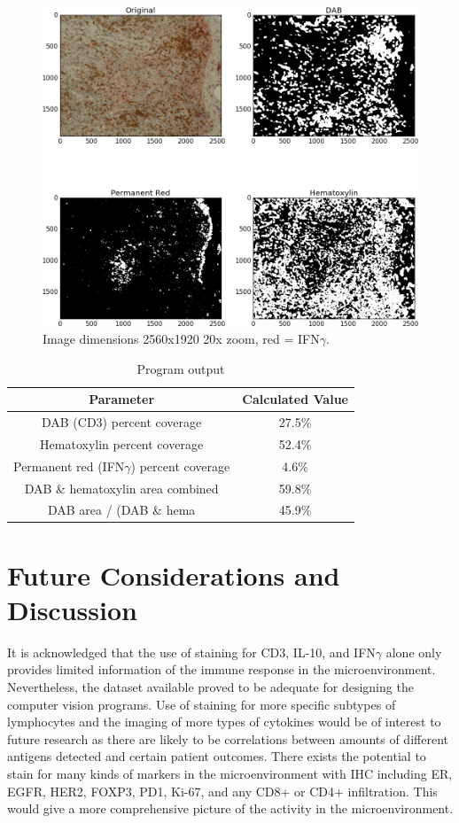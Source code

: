 \documentclass[12pt]{article}
\begin{document}
\begin{figure}[H]
  \includegraphics[width=\linewidth]{12_IFNg_20x.png}
  \caption{Image dimensions 2560x1920
20x zoom, red = IFN$\gamma$.}
  \label{fig:12 IFNg}
\end{figure}


\begin{table}[H]
\centering
\caption{Program output}
\label{program output}
\begin{tabular}{|c|c|}
\hline
\textbf{Parameter} & \textbf{Calculated Value} \\ \hline
DAB (CD3) percent coverage & 27.5\% \\ \hline
Hematoxylin percent coverage & 52.4\% \\ \hline
Permanent red (IFN$\gamma$) percent coverage & 4.6\% \\ \hline
DAB \& hematoxylin area combined & 59.8\% \\ \hline
DAB area / (DAB \& hema & 45.9\% \\ \hline
\end{tabular}
\end{table}


\section*{Future Considerations and Discussion}

It is acknowledged that the use of staining for CD3, IL-10, and IFN$\gamma$ alone only provides
limited information of the immune response in the microenvironment. Nevertheless, the dataset
available proved to be adequate for designing the computer vision programs. Use of staining for more
specific subtypes of lymphocytes and the imaging of more types of cytokines would be of interest to
future research as there are likely to be correlations between amounts of different antigens detected and certain patient outcomes. There exists the potential to stain for many kinds of markers in the microenvironment with IHC including ER, EGFR, HER2, FOXP3, PD1, Ki-67, and any CD8+ or
CD4+ infiltration. This would give a more comprehensive picture of the activity in the
microenvironment.
\end{document}
